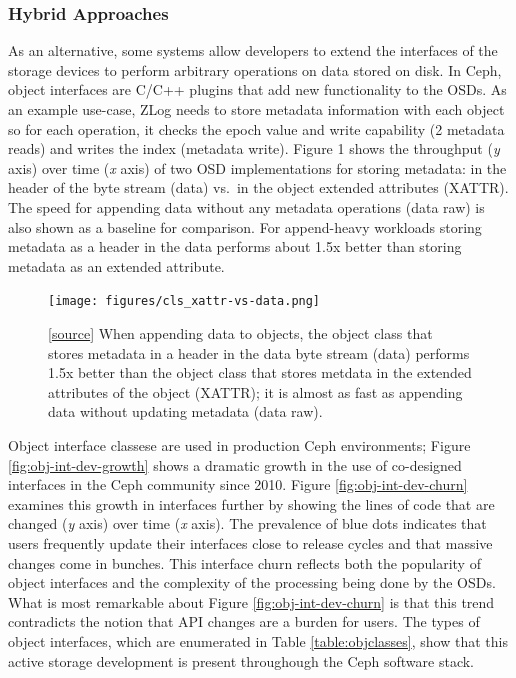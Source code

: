\documentclass[10pt,twocolumn]{article}
\begin{document}
\subsubsection{Hybrid Approaches}\label{hybrid-approaches}

As an alternative, some systems allow developers to extend the
interfaces of the storage devices to perform arbitrary operations on
data stored on disk. In Ceph, object interfaces are C/C++ plugins that
add new functionality to the OSDs. As an example use-case, ZLog needs to
store metadata information with each object so for each operation, it
checks the epoch value and write capability (2 metadata reads) and
writes the index (metadata write). Figure 1 shows the throughput
(\emph{y} axis) over time (\emph{x} axis) of two OSD implementations for
storing metadata: in the header of the byte stream (data) vs.~in the
object extended attributes (XATTR). The speed for appending data without
any metadata operations (data raw) is also shown as a baseline for
comparison. For append-heavy workloads storing metadata as a header in
the data performs about 1.5x better than storing metadata as an extended
attribute.

\begin{figure}[htbp]
\centering
\texttt{[image: figures/cls\_xattr-vs-data.png]}
\caption{{[}\href{https://github.com/michaelsevilla/malacology-popper/blob/master/experiments/figure1/visualize.ipynb}{source}{]}
When appending data to objects, the object class that stores metadata in
a header in the data byte stream (data) performs 1.5x better than the
object class that stores metdata in the extended attributes of the
object (XATTR); it is almost as fast as appending data without updating
metadata (data raw).}
\end{figure}

Object interface classese are used in production Ceph environments;
Figure \ref{fig:obj-int-dev-growth} shows a dramatic growth in the use
of co-designed interfaces in the Ceph community since 2010. Figure
\ref{fig:obj-int-dev-churn} examines this growth in interfaces further
by showing the lines of code that are changed (\emph{y} axis) over time
(\emph{x} axis). The prevalence of blue dots indicates that users
frequently update their interfaces close to release cycles and that
massive changes come in bunches. This interface churn reflects both the
popularity of object interfaces and the complexity of the processing
being done by the OSDs. What is most remarkable about Figure
\ref{fig:obj-int-dev-churn} is that this trend contradicts the notion
that API changes are a burden for users. The types of object interfaces,
which are enumerated in Table \ref{table:objclasses}, show that this
active storage development is present throughough the Ceph software
stack.
\end{document}
